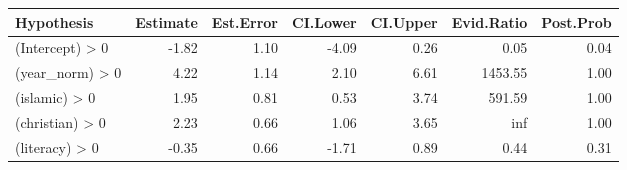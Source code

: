 \begin{tabular}{lrrrrrr}
\toprule
Hypothesis & Estimate & Est.Error & CI.Lower & CI.Upper & Evid.Ratio & Post.Prob \\
\midrule
(Intercept) > 0 & -1.82 & 1.10 & -4.09 & 0.26 & 0.05 & 0.04 \\
(year_norm) > 0 & 4.22 & 1.14 & 2.10 & 6.61 & 1453.55 & 1.00 \\
(islamic) > 0 & 1.95 & 0.81 & 0.53 & 3.74 & 591.59 & 1.00 \\
(christian) > 0 & 2.23 & 0.66 & 1.06 & 3.65 & inf & 1.00 \\
(literacy) > 0 & -0.35 & 0.66 & -1.71 & 0.89 & 0.44 & 0.31 \\
\bottomrule
\end{tabular}
